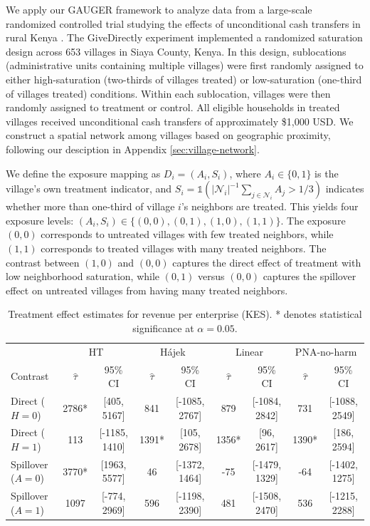 \documentclass[twoside,letterpaper]{article}
\newcommand{\mathbbm}[1]{\mathds{#1}}
\theoremstyle{plain}
\theoremstyle{definition}
\theoremstyle{remark}
\newcommand{\cN}{\mathcal{N}}
\newcommand{\indicator}{\mathbbm{1}}
\begin{document}
We apply our GAUGER framework to analyze data from a large-scale randomized controlled trial studying the effects of unconditional cash transfers in rural Kenya \citep{egger2022general}. The GiveDirectly experiment implemented a randomized saturation design across 653 villages in Siaya County, Kenya. In this design, sublocations (administrative units containing multiple villages) were first randomly assigned to either high-saturation (two-thirds of villages treated) or low-saturation (one-third of villages treated) conditions. Within each sublocation, villages were then randomly assigned to treatment or control. All eligible households in treated villages received unconditional cash transfers of approximately \$1,000 USD. We construct a spatial network among villages based on geographic proximity, following our desciption in Appendix \ref{sec:village-network}.

We define the exposure mapping as $D_i = (A_i, S_i)$, where $A_i \in \{0, 1\}$ is the village's own treatment indicator, and $S_i = \indicator({|\cN_i|^{-1}}{\sum_{j \in \cN_i} A_j} > {1}/{3})$ indicates whether more than one-third of village $i$'s neighbors are treated. This yields four exposure levels: $(A_i, S_i) \in \{(0,0), (0,1), (1,0), (1,1)\}$. The exposure $(0,0)$ corresponds to untreated villages with few treated neighbors, while $(1,1)$ corresponds to treated villages with many treated neighbors. The contrast between $(1,0)$ and $(0,0)$ captures the direct effect of treatment with low neighborhood saturation, while $(0,1)$ versus $(0,0)$ captures the spillover effect on untreated villages from having many treated neighbors.



\begin{table}[ht!]
    \centering
    \caption{Treatment effect estimates for revenue per enterprise (KES). * denotes statistical significance at $\alpha=0.05$.}
    \label{tab:revenue_results}
    \footnotesize
    \begin{tabular}{l cc cc cc cc}
        \toprule
        & \multicolumn{2}{c}{HT} & \multicolumn{2}{c}{H\'{a}jek} & \multicolumn{2}{c}{Linear} & \multicolumn{2}{c}{PNA-no-harm} \\
        \cmidrule(lr){2-3} \cmidrule(lr){4-5} \cmidrule(lr){6-7} \cmidrule(lr){8-9}
        Contrast & $\hat\tau$ & 95\% CI & $\hat\tau$ & 95\% CI & $\hat\tau$ & 95\% CI & $\hat\tau$ & 95\% CI \\
        \midrule
        Direct ($H=0$) & 2786* & [405, 5167] & 841 & [-1085, 2767] & 879 & [-1084, 2842] & 731 & [-1088, 2549] \\
        Direct ($H=1$) & 113 & [-1185, 1410] & 1391* & [105, 2678] & 1356* & [96, 2617] & 1390* & [186, 2594] \\
        Spillover ($A=0$) & 3770* & [1963, 5577] & 46 & [-1372, 1464] & -75 & [-1479, 1329] & -64 & [-1402, 1275] \\
        Spillover ($A=1$) & 1097 & [-774, 2969] & 596 & [-1198, 2390] & 481 & [-1508, 2470] & 536 & [-1215, 2288] \\
        \bottomrule
    \end{tabular}
\end{table}
\end{document}
